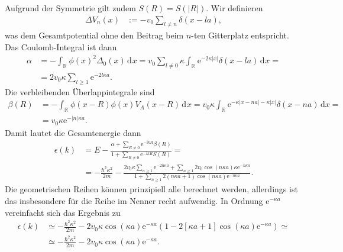 \documentclass[english, parskip=full]{scrartcl}
\newcommand{\intr}{}
\newcommand{\tecxt}{}
\renewcommand{\i}{\text{i}}
\newcommand{\e}{\text{e}}
\begin{document}
Aufgrund der Symmetrie gilt zudem $S(R) = S(|R|)$.
Wir definieren 
\begin{align}
\Delta V_n(x) &:= -v_0\sum_{l\neq n} \delta(x - la),
\end{align}
was dem Gesamtpotential ohne den Beitrag beim $n$-ten Gitterplatz entspricht.
Das Coulomb-Integral ist dann
\begin{align}
\alpha &= -\intr\int_{\mathbb{R}^{ }} \phi(x)^2\Delta_0(x) \, \mathrm{d}^{ }x = v_0\sum_{l\neq 0} \kappa \intr\int_{\mathbb{R}^{ }} \e^{-2\kappa |x|} \delta(x - la) \, \mathrm{d}^{ }x = \\
&= 2v_0\kappa \sum_{l \ge 1} \e^{-2l\kappa a}.
\end{align}
Die verbleibenden Überlappintegrale sind
\begin{align}
\beta(R) &= -\intr\int_{\mathbb{R}^{ }} \phi(x-R)\phi(x) V_A(x-R) \, \mathrm{d}^{ }x = v_0\kappa\intr\int_{\mathbb{R}^{ }} \e^{-\kappa |x-na|-\kappa |x|} \delta(x - na) \, \mathrm{d}x = \\
&= v_0\kappa \e^{-|n|\kappa a}.
\end{align}
Damit lautet die Gesamtenergie dann
\begin{align}
\epsilon(k) &= E - \frac{\alpha + \sum_{R\neq 0} \e^{-\i kR} \beta(R)}{1 + \sum_{R\neq 0} \e^{-\i kR} S(R)} = \\
&= -\frac{\hbar^2\kappa^2}{2m} - \frac{2v_0\kappa \sum_{n\ge 1}\e^{-2n\kappa a} + \sum_{n\ge 1} 2v_0 \cos(n\kappa a) \kappa \e^{-n\kappa a}}{1 + \sum_{n\ge 1} 2(n\kappa a+1) \cos(n\kappa a) \e^{-n\kappa a}} .%
\end{align}
Die geometrischen Reihen können prinzipiell alle berechnet werden, allerdings ist das insbesondere für die Reihe im Nenner recht aufwendig.
In Ordnung $\e^{-\kappa a}$ vereinfacht sich das Ergebnis zu
\begin{align}
\epsilon(k) &\simeq -\frac{\hbar^2\kappa^2}{2m} - 2v_0\kappa \cos(\kappa a) \e^{-\kappa a} \left( 1 - 2[\kappa a+1] \cos(\kappa a) \e^{-\kappa a} \right) \simeq \\
&\simeq -\frac{\hbar^2\kappa^2}{2m} - 2v_0\kappa \cos(\kappa a)\e^{-\kappa a}.
\end{align}
\end{document}
